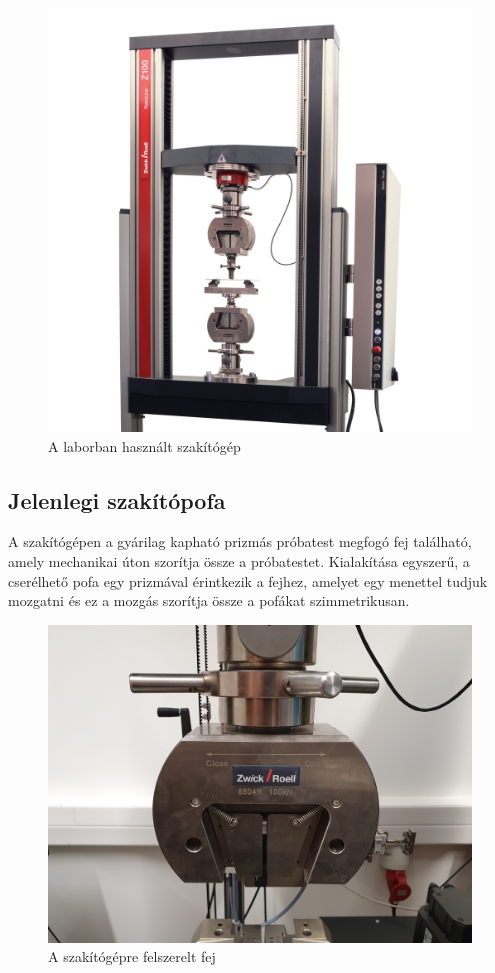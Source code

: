 \documentclass[12pt,a4paper,oneside]{report}
\begin{document}
\begin{figure}[H]
\centering
\includegraphics[width=14cm]{figures/zrz100}
\caption{A laborban használt szakítógép}
\label{Fig:zrz100}
\end{figure}

\subsection{Jelenlegi szakítópofa}
A szakítógépen a gyárilag kapható prizmás próbatest megfogó fej található, amely mechanikai úton szorítja össze a próbatestet. Kialakítása egyszerű, a cserélhető pofa egy prizmával érintkezik a fejhez, amelyet egy menettel tudjuk mozgatni és ez a mozgás szorítja össze a pofákat szimmetrikusan.

\begin{figure}[H]
\centering
\includegraphics[width=12cm]{figures/fej}
\caption{A szakítógépre felszerelt fej}
\label{Fig:fej}
\end{figure}
\end{document}
